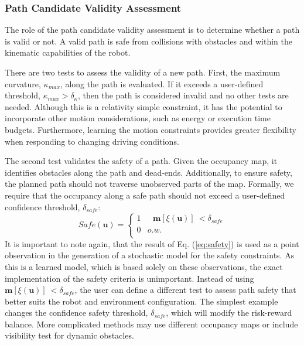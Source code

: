 \documentclass[shortAfour,sageh,times]{sagej_no_sage}
\begin{document}
\subsubsection{Path Candidate Validity Assessment}\hfill \break
  	The role of the path candidate validity assessment is to determine whether a path is valid or not. A valid path is safe from collisions with obstacles and within the kinematic capabilities of the robot. 
	
	There are two tests to assess the validity of a new path. First, the maximum curvature, $\kappa_{max}$, along the path is evaluated. If it exceeds a user-defined threshold, $\kappa_{max} > \delta_{\kappa}$, then the path is considered invalid and no other tests are needed. Although this is a relativity simple constraint, it has the  potential to incorporate other motion considerations, such as energy or execution time budgets. Furthermore, learning the motion constraints provides greater flexibility when responding to changing driving conditions.
	
	The second test validates the safety of a path. Given the occupancy map, it identifies obstacles along the path and dead-ends. Additionally, to ensure safety, the planned path should not traverse unobserved parts of the map. Formally, we require that the occupancy along a safe path should not exceed a user-defined confidence threshold, $\delta_{safe}$:
	\begin{equation}\label{eq:safety}
		Safe(\boldsymbol{u}) = 
		\begin{cases}
		1 & \text{ $\boldsymbol{m}[\xi(\boldsymbol{u})]\ < \delta_{safe}$}\\
		0 & o.w.\\
		\end{cases}
	\end{equation}
	It is important to note again, that the result of Eq. (\ref{eq:safety}) is used as a point observation in the generation of a stochastic model for the safety constraints. As this is a learned model, which is based solely on these observations, the exact implementation of the safety criteria is unimportant. Instead of using $\boldsymbol{m}[\xi(\boldsymbol{u})]\ < \delta_{safe}$, the user can define a different test to assess path safety that better suits the robot and environment configuration. The simplest example changes the confidence safety threshold, $\delta_{safe}$, which will modify the risk-reward balance. More complicated methods may use different occupancy maps or include visibility test for dynamic obstacles.
	      
\end{document}
